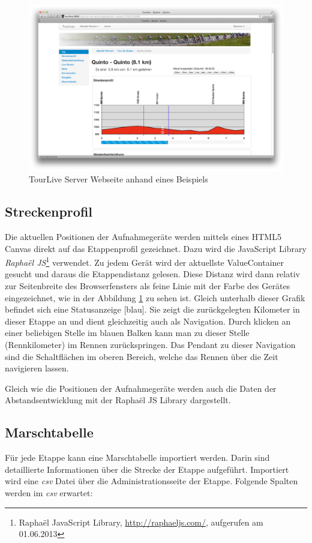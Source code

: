 \begin{figure}[H]
	\centering
	\includegraphics[width=130mm]{images/tourliveweb/tourlivewebansicht.png}
	\caption{TourLive Server Webseite anhand eines Beispiels}
	\label{fig:tourlivewebansicht}
\end{figure}

\subsection{Streckenprofil}
Die aktuellen Positionen der Aufnahmegeräte werden mittels eines HTML5 Canvas direkt auf das Etappenprofil gezeichnet. Dazu wird die JavaScript Library \textit{Raphaël JS}\footnote{Raphaël JavaScript Library, \url{http://raphaeljs.com/}, aufgerufen am 01.06.2013} verwendet. Zu jedem Gerät wird der aktuellste ValueContainer gesucht und daraus die Etappendistanz gelesen. Diese Distanz wird dann relativ zur Seitenbreite des Browserfensters als feine Linie mit der Farbe des Gerätes eingezeichnet, wie in der Abbildung \ref{fig:tourlivewebansicht} zu sehen ist. Gleich unterhalb dieser Grafik befindet sich eine Statusanzeige [blau]. Sie zeigt die zurückgelegten Kilometer in dieser Etappe an und dient gleichzeitig auch als Navigation. Durch klicken an einer beliebigen Stelle im blauen Balken kann man zu dieser Stelle (Rennkilometer) im Rennen zurückspringen. Das Pendant zu dieser Navigation sind die Schaltflächen im oberen Bereich, welche das Rennen über die Zeit navigieren lassen.

Gleich wie die Positionen der Aufnahmegeräte werden auch die Daten der Abstandsentwicklung mit der Raphaël JS Library dargestellt.

\subsection{Marschtabelle}
Für jede Etappe kann eine Marschtabelle importiert werden. Darin sind detaillierte Informationen über die Strecke der Etappe aufgeführt. Importiert wird eine \textit{\gls{csv}} Datei über die Administrationsseite der Etappe. Folgende Spalten werden im \textit{\gls{csv}} erwartet: 


